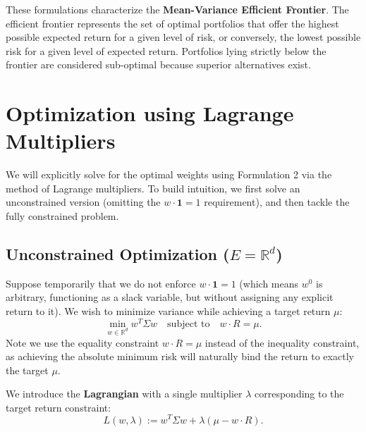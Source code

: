 These formulations characterize the \textbf{Mean-Variance Efficient Frontier}. The efficient frontier represents the set of optimal portfolios that offer the highest possible expected return for a given level of risk, or conversely, the lowest possible risk for a given level of expected return. Portfolios lying strictly below the frontier are considered sub-optimal because superior alternatives exist.

\section{Optimization using Lagrange Multipliers}

We will explicitly solve for the optimal weights using Formulation 2 via the method of Lagrange multipliers. To build intuition, we first solve an unconstrained version (omitting the $w \cdot \mathbf{1}=1$ requirement), and then tackle the fully constrained problem.

\subsection{Unconstrained Optimization ($E = \mathbb{R}^d$)}
Suppose temporarily that we do not enforce $w \cdot \mathbf{1} = 1$ (which means $w^0$ is arbitrary, functioning as a slack variable, but without assigning any explicit return to it). We wish to minimize variance while achieving a target return $\mu$:
\begin{equation*}
    \min_{w \in \mathbb{R}^d} w^T \Sigma w \quad \text{subject to} \quad w \cdot R = \mu.
\end{equation*}
Note we use the equality constraint $w \cdot R = \mu$ instead of the inequality constraint, as achieving the absolute minimum risk will naturally bind the return to exactly the target $\mu$.

We introduce the \textbf{Lagrangian} with a single multiplier $\lambda$ corresponding to the target return constraint:
\begin{equation}
    L(w, \lambda) := w^T \Sigma w + \lambda(\mu - w \cdot R).
\end{equation}

